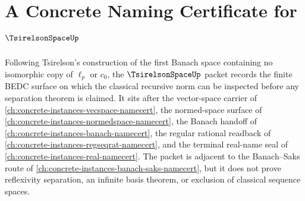 \chapter{A Concrete Naming Certificate for $\TsirelsonSpaceUp$}
\label{ch:concrete-instances-tsirelson-space-namecert}

Following Tsirelson's construction of the first Banach space containing no isomorphic copy of $\ell_p$ or $c_0$, the $\TsirelsonSpaceUp$ packet records the finite BEDC surface on which the classical recursive norm can be inspected before any separation theorem is claimed. It sits after the vector-space carrier of \autoref{ch:concrete-instances-vecspace-namecert}, the normed-space surface of \autoref{ch:concrete-instances-normedspace-namecert}, the Banach handoff of \autoref{ch:concrete-instances-banach-namecert}, the regular rational readback of \autoref{ch:concrete-instances-regseqrat-namecert}, and the terminal real-name seal of \autoref{ch:concrete-instances-real-namecert}. The packet is adjacent to the Banach--Saks route of \autoref{ch:concrete-instances-banach-saks-namecert}, but it does not prove reflexivity separation, an infinite basis theorem, or exclusion of classical sequence spaces.

